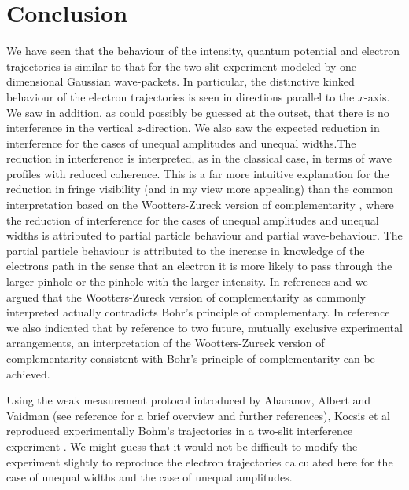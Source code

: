 \documentclass[12pt]{article}       %
\begin{document}
\section{Conclusion}
We have seen that the behaviour of the intensity, quantum potential and electron trajectories is similar to that for the  two-slit experiment modeled by  one-dimensional Gaussian wave-packets. In particular, the distinctive kinked behaviour of the electron trajectories is seen in directions parallel to the $x$-axis.  We saw in addition, as could possibly be guessed at the outset, that there is no interference in the vertical $z$-direction. We also saw the expected reduction in interference for the cases of unequal amplitudes and unequal widths.The reduction in interference  is interpreted, as in the classical case, in terms of  wave profiles with reduced coherence. This is a far more intuitive explanation for the reduction in fringe visibility (and in my view more appealing) than the common interpretation based on the Wootters-Zureck version of complementarity \cite{WZ79}, where the reduction  of interference for the cases of unequal amplitudes  and unequal widths   is attributed to partial particle behaviour and partial wave-behaviour. The partial particle behaviour is attributed to the increase in knowledge of the electrons path in the sense that an electron it is more likely to pass through the larger pinhole or the pinhole with the larger intensity. In references \cite{K92} and \cite{K2016} we argued that the Wootters-Zureck version of complementarity  as commonly interpreted actually contradicts Bohr's principle of complementary. In reference \cite{K2016} we also indicated that by   reference to two future, mutually exclusive experimental  arrangements, an interpretation of the Wootters-Zureck version of complementarity consistent with Bohr's principle of complementarity can be achieved.

Using the weak measurement protocol introduced by Aharanov, Albert and Vaidman (see reference \cite{K2017} for a brief overview and further references), Kocsis et al reproduced experimentally Bohm's trajectories in a two-slit interference experiment \cite{KOCSIS2011}. We might guess that it would not be difficult to modify the experiment slightly to reproduce the electron trajectories calculated here for the case of unequal widths and the case of unequal amplitudes. 


\end{document}
